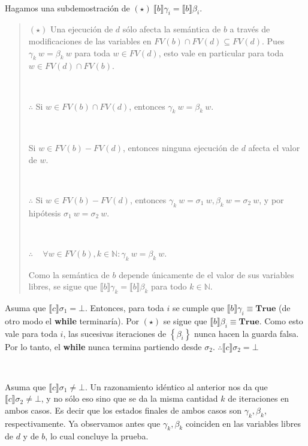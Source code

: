 \documentclass[a4paper, 12pt]{article}
\begin{document}
~

Hagamos una subdemostración de $(\star) ~  \llbracket b \rrbracket\gamma_i = \llbracket b
\rrbracket\beta_i$. 


\small
\begin{quote}

$(\star)$ Una ejecución de $d$ sólo afecta la semántica de $b$ a través de modificaciones
de las variables en $FV(b) \cap FV(d) \subseteq FV(d)$. Pues $\gamma_k ~ w =
\beta_k ~ w$ para toda $w \in FV(d)$, esto vale en particular para toda $w \in
FV(d) \cap FV(b)$.

~

$\therefore $ Si $w \in FV(b) \cap FV(d)$, entonces $\gamma_k ~ w = \beta_k ~
w$.

~

Si $w \in FV(b) - FV(d)$, entonces ninguna ejecución de $d$ afecta el valor de
$w$.

~ 

$\therefore $  Si $w \in FV(b) - FV(d)$, entonces $\gamma_k ~ w = \sigma_1 ~ w,
\beta_k ~ w = \sigma_2 ~ w$, y por hipótesis $\sigma_1 ~ w = \sigma_2 ~ w$.

~

$\therefore $ ~ $\forall w \in FV(b), k \in \mathbb{N} : \gamma_k ~ w = \beta_k
~ w$.

Como la semántica de $b$ depende únicamente de el valor de sus variables libres,
se sigue que $\llbracket b \rrbracket\gamma_k = \llbracket b \rrbracket\beta_k$
para todo $k \in \mathbb{N}$.

\end{quote}
\normalsize


Asuma que $\llbracket c \rrbracket\sigma_1 =\bot $. Entonces, para toda $i$ se
cumple que $\llbracket b \rrbracket\gamma_i \equiv \textbf{True}$ (de otro modo
el \textbf{while} terminaría). Por $(\star)$ se sigue que $\llbracket b
\rrbracket\beta_i \equiv \textbf{True}$. Como esto vale para toda $i$, las
sucesivas iteraciones de $\left\{ \beta_i \right\} $ nunca hacen la guarda
falsa. Por lo tanto, el \textbf{while} nunca termina partiendo desde $\sigma_2$.
$\therefore \llbracket c \rrbracket\sigma_2 = \bot $

~ 

Asuma que $\llbracket c \rrbracket\sigma_1 \neq \bot$. Un razonamiento idéntico
al anterior nos da que $\llbracket c \rrbracket\sigma_2 \neq \bot $, y no sólo
eso sino que se da la misma cantidad $k$ de iteraciones en ambos casos. Es decir
que los estados finales de ambos casos son $\gamma_k, \beta_k$, respectivamente.
Ya observamos antes que $\gamma_k, \beta_k$ coinciden en las variables libres de
$d$ y de $b$, lo cual concluye la prueba.
\end{document}
